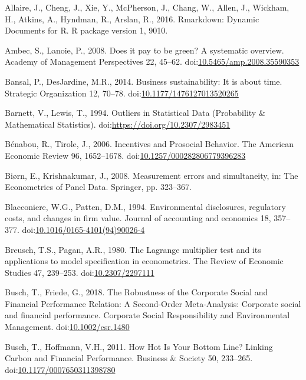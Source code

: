 \documentclass[12pt,]{article}
\begin{document}
\hypertarget{ref-Allaire2016}{}
Allaire, J., Cheng, J., Xie, Y., McPherson, J., Chang, W., Allen, J.,
Wickham, H., Atkins, A., Hyndman, R., Arslan, R., 2016. Rmarkdown:
Dynamic Documents for R. R package version 1, 9010.

\hypertarget{ref-Ambec2008}{}
Ambec, S., Lanoie, P., 2008. Does it pay to be green? A systematic
overview. Academy of Management Perspectives 22, 45--62.
doi:\href{https://doi.org/10.5465/amp.2008.35590353}{10.5465/amp.2008.35590353}

\hypertarget{ref-Bansal2014}{}
Bansal, P., DesJardine, M.R., 2014. Business sustainability: It is about
time. Strategic Organization 12, 70--78.
doi:\href{https://doi.org/10.1177/1476127013520265}{10.1177/1476127013520265}

\hypertarget{ref-Barnett1994}{}
Barnett, V., Lewis, T., 1994. Outliers in Statistical Data (Probability
\& Mathematical Statistics).
doi:\href{https://doi.org/https://doi.org/10.2307/2983451}{https://doi.org/10.2307/2983451}

\hypertarget{ref-BenabouIncentivesProsocialBehavior2006}{}
Bénabou, R., Tirole, J., 2006. Incentives and Prosocial Behavior. The
American Economic Review 96, 1652--1678.
doi:\href{https://doi.org/10.1257/000282806779396283}{10.1257/000282806779396283}

\hypertarget{ref-Biorn2008}{}
Biørn, E., Krishnakumar, J., 2008. Measurement errors and simultaneity,
in: The Econometrics of Panel Data. Springer, pp. 323--367.

\hypertarget{ref-Blacconiere1994}{}
Blacconiere, W.G., Patten, D.M., 1994. Environmental disclosures,
regulatory costs, and changes in firm value. Journal of accounting and
economics 18, 357--377.
doi:\href{https://doi.org/10.1016/0165-4101(94)90026-4}{10.1016/0165-4101(94)90026-4}

\hypertarget{ref-Breusch1980}{}
Breusch, T.S., Pagan, A.R., 1980. The Lagrange multiplier test and its
applications to model specification in econometrics. The Review of
Economic Studies 47, 239--253.
doi:\href{https://doi.org/10.2307/2297111}{10.2307/2297111}

\hypertarget{ref-Busch2018}{}
Busch, T., Friede, G., 2018. The Robustness of the Corporate Social and
Financial Performance Relation: A Second-Order Meta-Analysis: Corporate
social and financial performance. Corporate Social Responsibility and
Environmental Management.
doi:\href{https://doi.org/10.1002/csr.1480}{10.1002/csr.1480}

\hypertarget{ref-Busch2011a}{}
Busch, T., Hoffmann, V.H., 2011. How Hot Is Your Bottom Line? Linking
Carbon and Financial Performance. Business \& Society 50, 233--265.
doi:\href{https://doi.org/10.1177/0007650311398780}{10.1177/0007650311398780}
\end{document}
